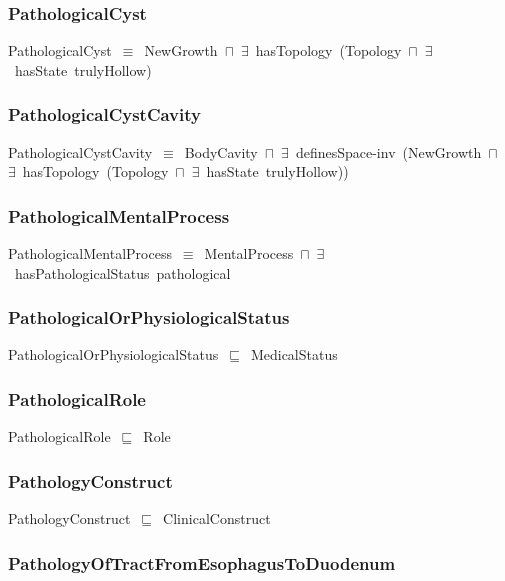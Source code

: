 \documentclass{article}
\begin{document}
\subsubsection*{PathologicalCyst}

PathologicalCyst~\ensuremath{\equiv}~NewGrowth~\ensuremath{\sqcap}~\ensuremath{\exists}~hasTopology~(Topology~\ensuremath{\sqcap}~\ensuremath{\exists}~hasState~trulyHollow)

\subsubsection*{PathologicalCystCavity}

PathologicalCystCavity~\ensuremath{\equiv}~BodyCavity~\ensuremath{\sqcap}~\ensuremath{\exists}~definesSpace-inv~(NewGrowth~\ensuremath{\sqcap}~\ensuremath{\exists}~hasTopology~(Topology~\ensuremath{\sqcap}~\ensuremath{\exists}~hasState~trulyHollow))

\subsubsection*{PathologicalMentalProcess}

PathologicalMentalProcess~\ensuremath{\equiv}~MentalProcess~\ensuremath{\sqcap}~\ensuremath{\exists}~hasPathologicalStatus~pathological

\subsubsection*{PathologicalOrPhysiologicalStatus}

PathologicalOrPhysiologicalStatus~\ensuremath{\sqsubseteq}~MedicalStatus~

\subsubsection*{PathologicalRole}

PathologicalRole~\ensuremath{\sqsubseteq}~Role~

\subsubsection*{PathologyConstruct}

PathologyConstruct~\ensuremath{\sqsubseteq}~ClinicalConstruct~

\subsubsection*{PathologyOfTractFromEsophagusToDuodenum}
\end{document}
